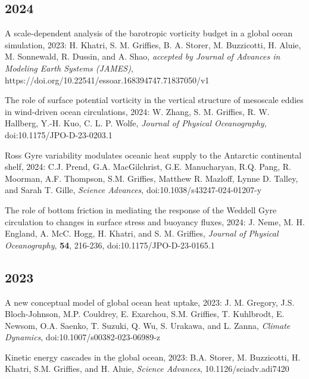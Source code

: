 \begin{etaremune}


\subsection*{\sc \color{Maroon} 2024}

\item A scale-dependent analysis of the barotropic vorticity budget in a global ocean simulation, 2023: H. Khatri, S. M. Grif\/f\/ies, B. A. Storer, M. Buzzicotti, H. Aluie, M. Sonnewald, R. Dussin, and A. Shao, {\it accepted by Journal of Advances in Modeling Earth Systems (JAMES)}, https://doi.org/10.22541/essoar.168394747.71837050/v1  

\item The role of surface potential vorticity in the vertical structure of mesoscale eddies in wind-driven ocean circulations, 2024: W. Zhang, S. M. Grif\/f\/ies, R. W. Hallberg, Y.-H. Kuo, C. L. P. Wolfe, {\it Journal of Physical Oceanography}, doi:10.1175/JPO-D-23-0203.1

\item Ross Gyre variability modulates oceanic heat supply to the Antarctic continental shelf, 2024: C.J. Prend, G.A. MacGilchrist, G.E. Manucharyan, R.Q. Pang, R. Moorman, A.F. Thompson, S.M. Grif\/f\/ies, Matthew R. Mazloff, Lynne D. Talley, and Sarah T. Gille, {\it Science Advances}, doi:10.1038/s43247-024-01207-y

\item  The role of bottom friction in mediating the response of the Weddell Gyre circulation to changes in surface stress and buoyancy fluxes, 2024: J. Neme, M. H. England, A. McC. Hogg, H. Khatri, and S. M. Grif\/f\/ies, {\it Journal of Physical Oceanography}, {\bf 54}, 216-236, doi:10.1175/JPO-D-23-0165.1 


\subsection*{\sc \color{Maroon} 2023}


\item A new conceptual model of global ocean heat uptake, 2023:  J. M. Gregory, J.S. Bloch-Johnson, M.P. Couldrey, E. Exarchou, S.M. Grif\/f\/ies, T. Kuhlbrodt, E. Newsom, O.A. Saenko, T. Suzuki, Q. Wu, S. Urakawa, and L. Zanna, {\it Climate Dynamics}, doi:10.1007/s00382-023-06989-z
 
\item Kinetic energy cascades in the global ocean, 2023: B.A. Storer, M. Buzzicotti, H. Khatri, S.M. Grif\/f\/ies, and H. Aluie,  {\it Science Advances}, 10.1126/sciadv.adi7420


\end{etaremune}
